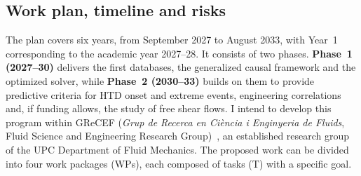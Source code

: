 \documentclass[11pt]{article}
\begin{document}
\subsection{Work plan, timeline and risks}\label{sec:workplan}

The plan covers six years, from September 2027 to August 2033, with Year~1 corresponding to the academic year 2027--28. 
It consists of two phases.
\textbf{Phase~1 (2027--30)} delivers the first databases, the generalized causal framework and the optimized solver, while \textbf{Phase~2 (2030--33)} builds on them to provide predictive criteria for HTD onset and extreme events, engineering correlations and, if funding allows, the study of free shear flows.
I intend to develop this program within GReCEF (\textit{Grup de Recerca en Ci\`encia i Enginyeria de Fluids}, Fluid Science and Engineering Research Group)~\cite{GReCEF}, an established research group of the UPC Department of Fluid Mechanics. 
The proposed work can be divided into four work packages (WPs), each composed of tasks (T) with a specific goal.
\end{document}
